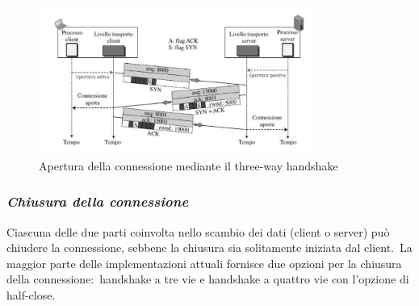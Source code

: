 \begin{figure}[H]
    \centering
    \includegraphics[width=0.8\textwidth]{immagini/3_way_open.jpg}
    \caption*{Apertura della connessione mediante il three-way handshake}
\end{figure}

\subsubsection{\emph{Chiusura della connessione}}

Ciascuna delle due parti coinvolta nello scambio dei dati (client o server) può chiudere la connessione, sebbene la chiusura sia solitamente iniziata dal client.\
La maggior parte delle implementazioni attuali fornisce due opzioni per la chiusura della connessione:\ handshake a tre vie e handshake a quattro vie con l'opzione di half-close.

